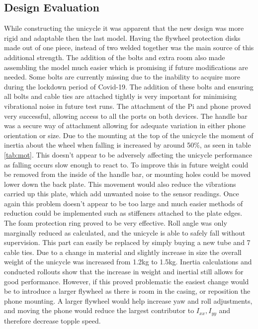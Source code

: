 \documentclass[twoside,twocolumn,12pt]{article}
\begin{document}
\subsection{Design Evaluation}
While constructing the unicycle it was apparent that the new design was more rigid and adaptable then the last model. Having the flywheel protection disks made out of one piece, instead of two welded together was the main source of this additional strength. The addition of the bolts and extra room also made assembling the model much easier which is promising if future modifications are needed. Some bolts are currently missing due to the inability to acquire more during the lockdown period of Covid-19. The addition of these bolts and ensuring all bolts and cable ties are attached tightly is very important for minimising vibrational noise in future test runs.
\newline
The attachment of the Pi and phone proved very successful, allowing access to all the ports on both devices. The handle bar was a secure way of attachment allowing for adequate variation in either phone orientation or size. Due to the mounting at the top of the unicycle the moment of inertia about the wheel when falling is increased by around 50\%, as seen in table \ref{tab:mot}. This doesn't appear to be adversely affecting the unicycle performance as falling occurs slow enough to react to. To improve this in future weight could be removed from the inside of the handle bar, or mounting holes could be moved lower down the back plate. This movement would also reduce the vibrations carried up this plate, which add unwanted noise to the sensor readings. Once again this problem doesn't appear to be too large and much easier methods of reduction could be implemented such as stiffeners attached to the plate edges.
\newline
The foam protection ring proved to be very effective. Roll angle was only marginally reduced as calculated, and the unicycle is able to safely fall without supervision. This part can easily be replaced by simply buying a new tube \cite{foam} and 7 cable ties.
\newline
Due to a change in material and slightly increase in size the overall weight of the unicycle was increased from 1.2kg to 1.5kg. Inertia calculations and conducted rollouts show that the increase in weight and inertial still allows for good performance. However, if this proved problematic the easiest change would be to introduce a larger flywheel as there is room in the casing, or reposition the phone mounting. A larger flywheel would help increase yaw and roll adjustments, and moving the phone would reduce the largest contributor to $I_{xx},I_{yy}$ and therefore decrease topple speed.  
\end{document}
